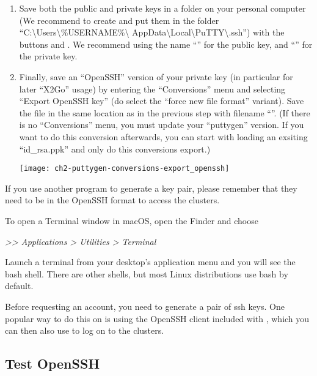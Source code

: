 \begin{enumerate}
    \item  Save both the public and private keys in a folder on your
      personal computer (We recommend to create and put them in the folder
      ``C:\textbackslash Users\textbackslash \%USERNAME\%\textbackslash
      AppData\textbackslash Local\textbackslash PuTTY\textbackslash .ssh'')
      with the buttons  and .
      We recommend using the name ``'' for the public key,
      and ``'' for the private key.
    \item  Finally, save an ``OpenSSH'' version of your private key (in particular for later ``X2Go'' usage)
      by entering the ``Conversions'' menu and selecting ``Export OpenSSH key''
      (do  select the ``force new file format'' variant).
      Save the file in the same location as in the previous step
      with filename ``''.
      (If there is no ``Conversions'' menu, you must update your ``puttygen'' version.
      If you want to do this conversion afterwards, you can start with loading an exsiting ``id\_rsa.ppk''
      and only do this conversions export.)
    \begin{center}
    \texttt{[image: ch2-puttygen-conversions-export\_openssh]}
    \end{center}

  \end{enumerate}

  If you use another program to generate a key pair, please remember that they
  need to be in the OpenSSH format to access the \hpc clusters.
\fi %

\ifmac
  To open a Terminal window in macOS, open the Finder and choose

  \emph{>{}>{} Applications >{} Utilities >{} Terminal}
\fi

\iflinux
  Launch a terminal from your desktop's application menu and you will see the
  bash shell.
  There are other shells, but most Linux distributions use bash by default.
\fi

\ifmacORlinux
  Before requesting an account, you need to generate a pair of ssh keys. One
  popular way to do this on \OS is using the OpenSSH client included with \OS
  , which you can then also use to log on to the clusters.

  \subsection{Test OpenSSH}
  \label{sec:test-openssh}

